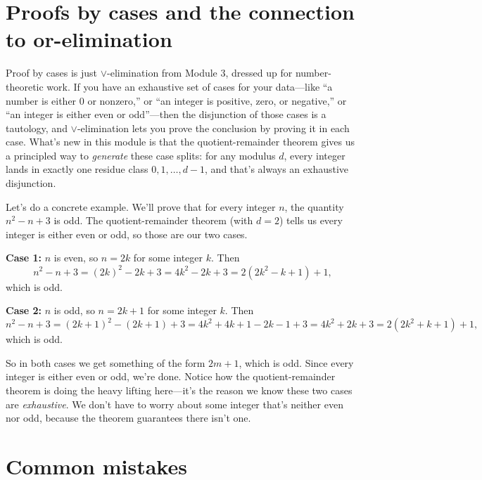 \documentclass[11pt]{article}
\begin{document}
\section{Proofs by cases and the connection to or-elimination}
Proof by cases is just $\vee$-elimination from Module 3, dressed up for number-theoretic work. If you have an exhaustive set of cases for your data---like ``a number is either $0$ or nonzero,'' or ``an integer is positive, zero, or negative,'' or ``an integer is either even or odd''---then the disjunction of those cases is a tautology, and $\vee$-elimination lets you prove the conclusion by proving it in each case. What's new in this module is that the quotient-remainder theorem gives us a principled way to \emph{generate} these case splits: for any modulus $d$, every integer lands in exactly one residue class $0, 1, \ldots, d-1$, and that's always an exhaustive disjunction.

Let's do a concrete example. We'll prove that for every integer $n$, the quantity $n^2 - n + 3$ is odd. The quotient-remainder theorem (with $d = 2$) tells us every integer is either even or odd, so those are our two cases.

\textbf{Case 1:} $n$ is even, so $n = 2k$ for some integer $k$. Then
\[
  n^2 - n + 3 = (2k)^2 - 2k + 3 = 4k^2 - 2k + 3 = 2(2k^2 - k + 1) + 1,
\]
which is odd.

\textbf{Case 2:} $n$ is odd, so $n = 2k + 1$ for some integer $k$. Then
\[
  n^2 - n + 3 = (2k+1)^2 - (2k+1) + 3 = 4k^2 + 4k + 1 - 2k - 1 + 3 = 4k^2 + 2k + 3 = 2(2k^2 + k + 1) + 1,
\]
which is odd.

So in both cases we get something of the form $2m + 1$, which is odd. Since every integer is either even or odd, we're done. Notice how the quotient-remainder theorem is doing the heavy lifting here---it's the reason we know these two cases are \emph{exhaustive}. We don't have to worry about some integer that's neither even nor odd, because the theorem guarantees there isn't one.

\section{Common mistakes}
\end{document}
